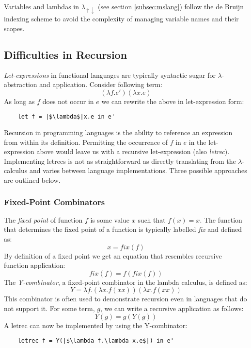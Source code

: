 \documentclass[a4paper,12pt,twoside,openright]{report}
\theoremstyle{definition}
\newcommand{\mslang}{$\lambda_{\uparrow\downarrow}$}
\begin{document}
Variables and lambdas in \mslang{} (see section \ref{subsec:mslang}) follow the de Bruijn indexing scheme to avoid the complexity of managing variable names and their scopes.

\subsection{Difficulties in Recursion}\label{subsec:recursion}
\textit{Let-expressions} in functional languages are typically syntactic sugar for $\lambda$-abstraction and application. Consider following term:
\begin{equation*}
    (\lambda f.e')(\lambda x.e)
\end{equation*}
As long as $f$ does not occur in $e$ we can rewrite the above in let-expression form:
\begin{verbatim}
    let f = |$\lambda$|x.e in e'
\end{verbatim}

Recursion in programming languages is the ability to reference an expression from within its definition. Permitting the occurrence of $f$ in $e$ in the let-expression above would leave us with a recursive let-expression (also \textit{letrec}). Implementing letrecs is not as straightforward as directly translating from the $\lambda$-calculus and varies between language implementations. Three possible approaches are outlined below.

\subsubsection{Fixed-Point Combinators}
The \textit{fixed point} of function $f$ is some value $x$ such that $f(x)=x$. The function that determines the fixed point of a function is typically labelled \textit{fix} and defined as:
\begin{equation*}
    x = \mathit{fix}(f)
\end{equation*}
By definition of a fixed point we get an equation that resembles recursive function application:
\begin{equation*}
    \mathit{fix}(f) = f (\mathit{fix}(f))
\end{equation*}
The \textit{Y-combinator}, a fixed-point combinator in the lambda calculus, is defined as:
\begin{equation*}
    Y=\lambda f.(\lambda x.f(x x)) (\lambda x.f(x x))
\end{equation*}
This combinator is often used to demonstrate recursion even in languages that do not support it. For some term, $g$, we can write a recursive application as follows:
\begin{equation*}
    Y(g) = g(Y(g))
\end{equation*}
A letrec can now be implemented by using the Y-combinator:
\begin{verbatim}
    letrec f = Y(|$\lambda f.\lambda x.e$|) in e'
\end{verbatim}
\end{document}
